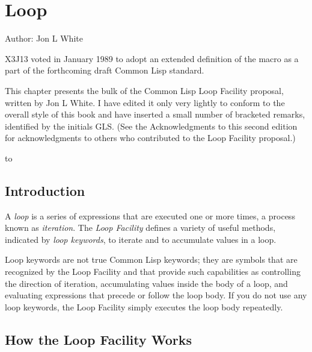 
\clearpage\def\pagestatus{FINAL PROOF}

\chapter{Loop}
\label{LOOP}

Author: Jon L White

\begin{new}
X3J13 voted in January 1989
to adopt an extended definition of the  macro
as a part of the forthcoming draft Common Lisp standard.

This chapter presents the bulk of the Common Lisp
Loop Facility proposal, written by Jon L White.  I have
edited it only very lightly
to conform to the overall style of this book and have inserted a small
number of bracketed remarks, identified by the initials GLS.
(See the Acknowledgments to this second edition for
acknowledgments to others who contributed to the Loop Facility proposal.)

\noindent\hbox to \textwidth{\hss---Guy L. Steele Jr.}

\section{Introduction}

A {\it loop\/} is a series of expressions that are executed one or more times,
a process known as {\it iteration}.
The {\it Loop Facility\/} defines a
variety of useful methods, indicated by
{\it loop keywords}, to iterate and to
accumulate values in a loop.


Loop keywords are not true Common Lisp keywords; they are symbols that
are recognized by the Loop Facility and that provide such capabilities
as controlling the direction of iteration, accumulating values inside
the body of a loop, and evaluating expressions that precede or follow
the loop body.  If you do not use any loop keywords, the Loop Facility
simply executes the loop body repeatedly.


\section{How the Loop Facility Works}


\end{new}
